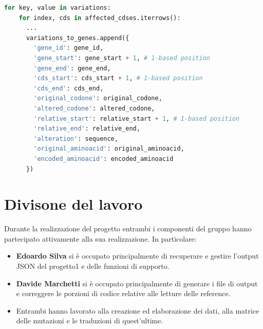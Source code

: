 \documentclass[11pt,italian]{article}
\begin{document}
\newpage
\begin{lstlisting}[language=Python,caption=Memorizzazione dei risultati nella struttura dati a lista,label=code:variation_loop]
  for key, value in variations:
    for index, cds in affected_cdses.iterrows():
      ...
      variations_to_genes.append({
        'gene_id': gene_id,
        'gene_start': gene_start + 1, # 1-based position
        'gene_end': gene_end,
        'cds_start': cds_start + 1, # 1-based position
        'cds_end': cds_end,
        'original_codone': original_codone,
        'altered_codone': altered_codone,
        'relative_start': relative_start + 1, # 1-based position
        'relative_end': relative_end,
        'alteration': sequence,
        'original_aminoacid': original_aminoacid,
        'encoded_aminoacid': encoded_aminoacid
      })
\end{lstlisting}

\newpage
\section{Divisone del lavoro}
Durante la realizzazione del progetto entrambi i componenti del gruppo hanno partecipato attivamente alla sua realizzazione. In particolare:
\begin{itemize}
  \item \textbf{Edoardo Silva} si è occupato principalmente di recuperare e gestire l'output JSON del progetto1 e delle funzioni di supporto.
  \item \textbf{Davide Marchetti} si è occupato principalmente di generare i file di output e correggere le porzioni di codice relative alle letture delle reference.
  \item Entrambi hanno lavorato alla creazione ed elaborazione dei dati, alla matrice delle mutazioni e le traduzioni di quest'ultime.
\end{itemize}
\end{document}
